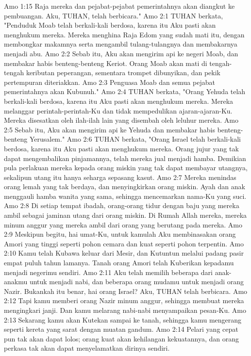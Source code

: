 Amo 1:15  Raja mereka dan pejabat-pejabat pemerintahnya akan diangkut ke pembuangan. Aku, TUHAN, telah berbicara."
Amo 2:1  TUHAN berkata, "Penduduk Moab telah berkali-kali berdosa, karena itu Aku pasti akan menghukum mereka. Mereka menghina Raja Edom yang sudah mati itu, dengan membongkar makamnya serta mengambil tulang-tulangnya dan membakarnya menjadi abu.
Amo 2:2  Sebab itu, Aku akan mengirim api ke negeri Moab, dan membakar habis benteng-benteng Keriot. Orang Moab akan mati di tengah-tengah keributan peperangan, sementara trompet dibunyikan, dan pekik pertempuran diteriakkan.
Amo 2:3  Penguasa Moab dan semua pejabat pemerintahnya akan Kubunuh."
Amo 2:4  TUHAN berkata, "Orang Yehuda telah berkali-kali berdosa, karena itu Aku pasti akan menghukum mereka. Mereka melanggar perintah-perintah-Ku dan tidak mempedulikan ajaran-ajaran-Ku. Mereka disesatkan oleh ilah-ilah lain yang disembah oleh leluhur mereka.
Amo 2:5  Sebab itu, Aku akan mengirim api ke Yehuda dan membakar habis benteng-benteng Yerusalem."
Amo 2:6  TUHAN berkata, "Orang Israel telah berkali-kali berdosa, karena itu Aku pasti akan menghukum mereka. Orang jujur yang tak dapat mengembalikan pinjamannya, telah mereka jual menjadi hamba. Demikian pula perlakuan mereka kepada orang miskin yang tak dapat membayar utangnya, sekalipun utang itu hanya seharga sepasang kasut.
Amo 2:7  Mereka menindas orang lemah yang tak berdaya, dan menyingkirkan orang miskin. Ayah dan anak menggauli hamba wanita yang sama, sehingga mencemarkan nama-Ku yang suci.
Amo 2:8  Di setiap tempat ibadah, orang-orang tidur dengan baju yang mereka ambil sebagai jaminan utang dari orang miskin. Di Rumah Allah mereka, mereka minum anggur yang mereka ambil dari orang yang berutang pada mereka.
Amo 2:9  Meskipun begitu, hai umat-Ku, untuk kamulah Aku membinasakan orang Amori yang tinggi seperti pohon cemara dan kuat seperti pohon terpentin.
Amo 2:10  Kamu telah Kubawa keluar dari Mesir, dan Kutuntun melalui padang pasir empat puluh tahun lamanya. Tanah orang Amori telah Kuberikan kepadamu menjadi negerimu sendiri.
Amo 2:11  Aku telah memilih beberapa dari anak-anakmu untuk menjadi nabi, dan beberapa orang mudamu untuk menjadi orang Nazir. Bukankah itu benar, hai orang Israel? Aku, TUHAN telah berbicara.
Amo 2:12  Tapi kamu memberi orang Nazir minum anggur, sehingga membuat mereka mengingkari janji. Dan kamu melarang nabi-nabi menyampaikan pesan-Ku.
Amo 2:13  Sekarang kamu akan Kutekan sampai ke tanah, sehingga kamu mengerang seperti kereta yang sarat dengan muatan gandum.
Amo 2:14  Pelari yang cepat pun tak akan dapat lolos; orang kuat akan kehilangan kekuatannya, dan orang perkasa tak akan dapat menyelamatkan dirinya sendiri.
